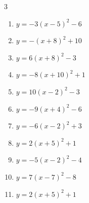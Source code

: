 \begin{multicols}{3}
\begin{enumerate}
  \item $\displaystyle y=-3\left( x-5\right)^{2}-6$

        \phantom{$\displaystyle 頂点\left( 5 , -6 \right)$}

  \item $\displaystyle y=-\left( x+8\right)^{2}+10$

        \phantom{$\displaystyle 頂点\left( -8 , 10 \right)$}

  \item $\displaystyle y=6\left( x+8\right)^{2}-3$

        \phantom{$\displaystyle 頂点\left( -8 , -3 \right)$}

  \item $\displaystyle y=-8\left( x+10\right)^{2}+1$

        \phantom{$\displaystyle 頂点\left( -10 , 1 \right)$}

  \item $\displaystyle y=10\left( x-2\right)^{2}-3$

        \phantom{$\displaystyle 頂点\left( 2 , -3 \right)$}

  \item $\displaystyle y=-9\left( x+4\right)^{2}-6$

        \phantom{$\displaystyle 頂点\left( -4 , -6 \right)$}

  \item $\displaystyle y=-6\left( x-2\right)^{2}+3$

        \phantom{$\displaystyle 頂点\left( 2 , 3 \right)$}

\columnbreak %

\resetques

  \item $\displaystyle y=2\left( x+5\right)^{2}+1$

        \phantom{$\displaystyle 頂点\left( -5 , 1 \right)$}

  \item $\displaystyle y=-5\left( x-2\right)^{2}-4$

        \phantom{$\displaystyle 頂点\left( 2 , -4 \right)$}

  \item $\displaystyle y=7\left( x-7\right)^{2}-8$

        \phantom{$\displaystyle 頂点\left( 7 , -8 \right)$}

  \item $\displaystyle y=2\left( x+5\right)^{2}+1$

        \phantom{$\displaystyle 頂点\left( -5 , 1 \right)$}


\end{enumerate}
\end{multicols}
